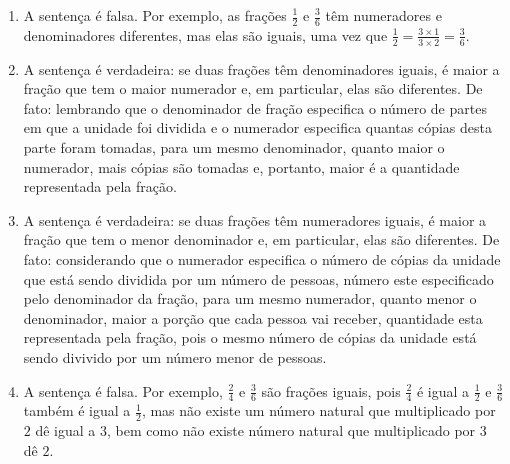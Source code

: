 \begin{atividade}
\solucao
\begin{enumerate} %
    \item A sentença é falsa. Por exemplo, as frações $\frac{1}{2}$ e
$\frac{3}{6}$ têm numeradores e denominadores diferentes, mas elas são iguais,
uma vez que $\frac{1}{2} = \frac{3 \times 1}{3 \times 2} = \frac{3}{6}$.
    \item A sentença é verdadeira: se duas frações têm denominadores iguais, é
maior a fração que tem o maior numerador e, em particular, elas são diferentes.
De fato: lembrando que o denominador de fração especifica o número de partes em
que a unidade foi dividida e o numerador especifica quantas cópias desta parte
foram tomadas, para um mesmo denominador, quanto maior o numerador, mais cópias
são tomadas e, portanto, maior é a quantidade representada pela fração.
    \item  A sentença é verdadeira: se duas frações têm numeradores iguais, é
maior a fração que tem o menor denominador e, em particular, elas são
diferentes. De fato: considerando que o numerador especifica o número de cópias
da unidade que está sendo dividida por um número de pessoas, número este
especificado pelo denominador da fração, para um mesmo numerador, quanto menor o
denominador, maior a porção que cada pessoa vai receber, quantidade esta
representada pela fração, pois o mesmo número de cópias da unidade está sendo
divivido por um número menor de pessoas.
    \item A sentença é falsa. Por exemplo, $\frac{2}{4}$ e $\frac{3}{6}$ são
frações iguais, pois $\frac{2}{4}$ é igual a $\frac{1}{2}$ e $\frac{3}{6}$
também é igual a $\frac{1}{2}$, mas não existe um número natural que
multiplicado por $2$ dê igual a $3$, bem como não existe número natural que
multiplicado por $3$ dê $2$.
\end{enumerate}

\end{atividade}

\clearpage

